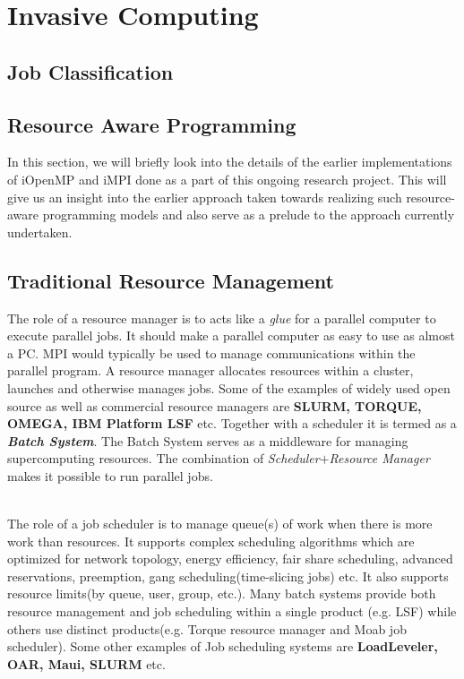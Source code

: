 \chapter{Invasive Computing}\label{chapter:invasive computing}
\section{Job Classification}

\section{Resource Aware Programming}
In this section, we will briefly look into the details of the earlier implementations of iOpenMP and iMPI done as a part of this ongoing research project. This will give us an insight into the earlier approach taken towards realizing such resource-aware programming models and also serve as a prelude to the approach currently undertaken.

\section{Traditional Resource Management}
The role of a resource manager is to acts like a \textit{glue} for a parallel computer to execute parallel jobs. It should make a parallel computer as easy to use as almost a PC. MPI would typically be used to manage communications within the parallel program. A resource manager allocates resources within a cluster, launches and otherwise manages jobs. Some of the examples of widely used open source as well as commercial resource managers are \textbf{SLURM, TORQUE, OMEGA, IBM Platform LSF} etc. Together with a scheduler it is termed as a \textbf{\textit{Batch System}}. The Batch System serves as a middleware for managing supercomputing resources. The combination of \textit{Scheduler}$+$\textit{Resource Manager} makes it possible to run parallel jobs.\par
\noindent
\\
The role of a job scheduler is to manage queue(s) of work when there is more work than resources. It supports complex scheduling algorithms which are optimized for network topology, energy efficiency, fair share scheduling, advanced reservations, preemption, gang scheduling(time-slicing jobs) etc. It also supports resource limits(by queue, user, group, etc.). Many batch systems provide both resource management and job scheduling within a single product (e.g. LSF) while others use distinct products(e.g. Torque resource manager and Moab job scheduler). Some other examples of Job scheduling systems are \textbf{LoadLeveler, OAR, Maui, SLURM} etc.\par
\noindent
\\
